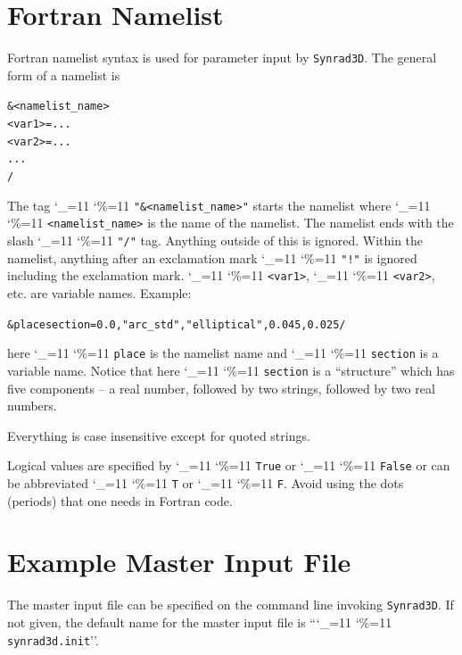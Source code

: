 \documentclass[11pt,openany]{report}
\newcommand{\srthree}{\texttt{Synrad3D}\xspace}
\newcommand\ttcmd{\begingroup\catcode`\_=11 \catcode`\%=11 \dottcmd}
\newcommand\dottcmd[1]{\texttt{#1}\endgroup}
\newcommand{\vn}{\ttcmd}
\newlength{\ExBeg}
\newlength{\ExEnd}
\newenvironment{example}
  {\vspace{\ExBeg} \begin{alltt}}
  {\end{alltt} \vspace{\ExEnd}}
\begin{document}
\section{Fortran Namelist}
\label{s:namelist}

Fortran namelist syntax is used for parameter input by \srthree. The
general form of a namelist is
\begin{example}
  &<namelist_name>
    <var1> = ...
    <var2> = ...
    ...
  /
\end{example}
The tag \vn{"\&<namelist_name>"} starts the namelist where
\vn{<namelist_name>} is the name of the namelist. The namelist ends
with the slash \vn{"/"} tag. Anything outside of this is
ignored. Within the namelist, anything after an exclamation mark
\vn{"!"} is ignored including the exclamation mark. \vn{<var1>},
\vn{<var2>}, etc. are variable names. Example:
\begin{example}
  &place section =   0.0, "arc_std", "elliptical", 0.045, 0.025 /
\end{example}
here \vn{place} is the namelist name and \vn{section} is a
variable name.  Notice that here \vn{section} is a ``structure'' which
has five components -- a real number, followed by two strings,
followed by two real numbers.

Everything is case insensitive except for quoted strings.

Logical values are specified by \vn{True} or \vn{False} or can be
abbreviated \vn{T} or \vn{F}. Avoid using the dots (periods) that one
needs in Fortran code.

\section{Example Master Input File} 
\label{s:master.example}

The master input file can be specified on the command line invoking \srthree.
If not given, the default name for the master input file is ``\vn{synrad3d.init}''.
\end{document}
